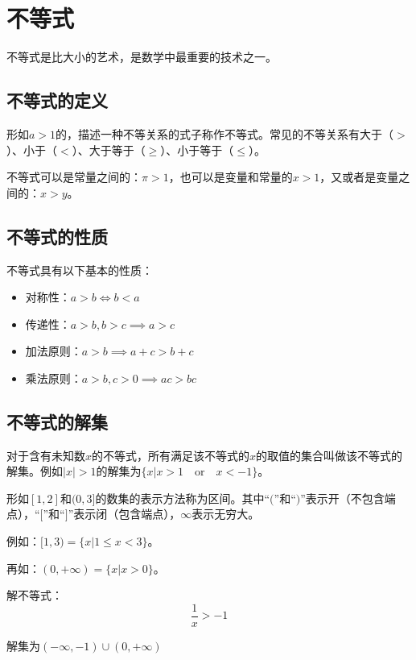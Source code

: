 \section{不等式}
不等式是比大小的艺术，是数学中最重要的技术之一。
\subsection{不等式的定义}
\begin{definition}[不等式]
    形如$a>1$的，描述一种不等关系的式子称作不等式。常见的不等关系有大于（$>$）、小于（$<$）、大于等于（$\geq$）、小于等于（$\leq$）。
\end{definition}
不等式可以是常量之间的：$\pi>1$，也可以是变量和常量的$x>1$，又或者是变量之间的：$x>y$。
\subsection{不等式的性质}
不等式具有以下基本的性质：
\begin{itemize}
    \item 对称性：$a>b \iff b<a$
    \item 传递性：$a>b,b>c \implies a>c$
    \item 加法原则：$a>b \implies a+c>b+c$
    \item 乘法原则：$a>b, c>0 \implies ac>bc$
\end{itemize}
\subsection{不等式的解集}
\begin{definition}[解集]
    对于含有未知数$x$的不等式，所有满足该不等式的$x$的取值的集合叫做该不等式的解集。例如$|x|>1$的解集为$\{x|x>1 \quad \mathrm{or} \quad x<-1\}$。
\end{definition}
\begin{definition}[区间]
    形如$[1,2]$和$(0,3]$的数集的表示方法称为区间。其中“$($”和“$)$”表示开（不包含端点），“$[$”和“$]$”表示闭（包含端点），$\infty$表示无穷大。

    例如：$[1,3) = \{x|1\leq x< 3\}$。

    再如：$(0,+\infty) = \{x|x>0\}$。
\end{definition}

\begin{exercise}
    解不等式：$$\frac{1}{x}>-1$$
\end{exercise}
\begin{solution}
    解集为$(-\infty,-1)\cup(0,+\infty)$
\end{solution}
